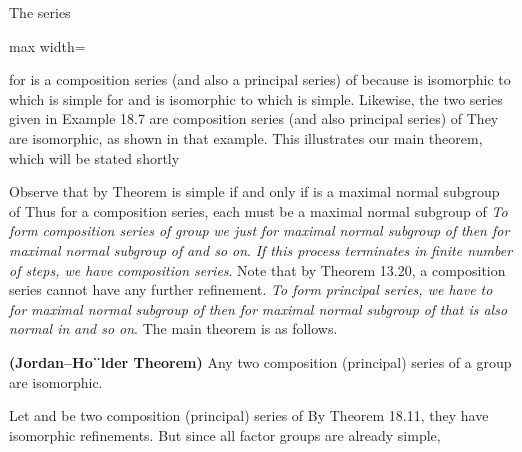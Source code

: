 \documentclass[11pt,oneside]{article}
\begin{document}
\begin{BookBody}
 The series

\begin{center}\begin{adjustbox}{max width=\linewidth}\end{adjustbox}\end{center}

\noindent for  is a composition series (and also a principal series) of  because  is isomorphic to  which is simple for  and  is isomorphic to  which is simple. Likewise, the two series given in Example 18.7 are composition series (and also principal series) of  They are isomorphic, as shown in that example. This illustrates our main theorem, which will be stated shortly\BookEnd{\blacktriangle}

Observe that by Theorem  is simple if and only if  is a maximal normal subgroup of  Thus for a composition series, each  must be a maximal normal subgroup of  \textit{To form}  \textit{composition series of}  \textit{group}  \textit{we just}  \textit{for}  \textit{maximal normal subgroup}  \textit{of}  \textit{then for}  \textit{maximal normal subgroup}  \textit{of}  \textit{and so on}.\textit{ If this process terminates in}  \textit{finite number of steps, we have}  \textit{composition series}. Note that by Theorem 13.20, a composition series cannot have any further refinement.\textit{ To form}  \textit{principal series, we have to}  \textit{for}  \textit{maximal normal} \textit{subgroup}  \textit{of}  \textit{then for}  \textit{maximal normal subgroup}  \textit{of}  \textit{that is also} \textit{normal in}  \textit{and so on}. The main theorem is as follows.

 \textbf{(Jordan–Ho¨lder Theorem)} Any two composition (principal) series of a group  are isomorphic.

 Let  and  be two composition (principal) series of  By Theorem 18.11, they have isomorphic refinements. But since all factor groups are already simple,

\end{BookBody}
\end{document}

